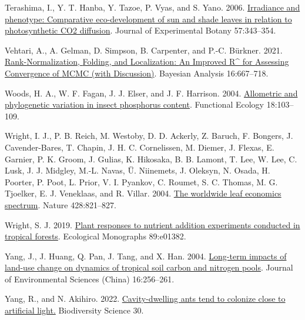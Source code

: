 \documentclass[
  12pt,
  letterpaper,
  DIV=11,
  numbers=noendperiod]{scrartcl}
\newlength{\cslhangindent}
\newlength{\cslentryspacingunit} %
\newenvironment{CSLReferences}[2] %
 {%
  \setlength{\parindent}{0pt}
  \ifodd #1
  \let\oldpar\par
  \def\par{\hangindent=\cslhangindent\oldpar}
  \fi
  \setlength{\parskip}{#2\cslentryspacingunit}
 }%
 {}
\begin{document}
\begin{CSLReferences}{1}{0}
\leavevmode{}%
Terashima, I., Y. T. Hanba, Y. Tazoe, P. Vyas, and S. Yano. 2006.
\href{https://doi.org/10.1093/jxb/erj014}{Irradiance and phenotype:
{Comparative} eco-development of sun and shade leaves in relation to
photosynthetic {CO2} diffusion}. Journal of Experimental Botany
57:343--354.

\leavevmode{}%
Vehtari, A., A. Gelman, D. Simpson, B. Carpenter, and P.-C. Bürkner.
2021. \href{https://doi.org/10.1214/20-BA1221}{Rank-{Normalization},
{Folding}, and {Localization}: {An Improved R\^{}} for {Assessing
Convergence} of {MCMC} (with {Discussion})}. Bayesian Analysis
16:667--718.

\leavevmode{}%
Woods, H. A., W. F. Fagan, J. J. Elser, and J. F. Harrison. 2004.
\href{https://doi.org/10.1111/j.1365-2435.2004.00823.x}{Allometric and
phylogenetic variation in insect phosphorus content}. Functional Ecology
18:103--109.

\leavevmode{}%
Wright, I. J., P. B. Reich, M. Westoby, D. D. Ackerly, Z. Baruch, F.
Bongers, J. Cavender-Bares, T. Chapin, J. H. C. Cornelissen, M. Diemer,
J. Flexas, E. Garnier, P. K. Groom, J. Gulias, K. Hikosaka, B. B.
Lamont, T. Lee, W. Lee, C. Lusk, J. J. Midgley, M.-L. Navas, Ü.
Niinemets, J. Oleksyn, N. Osada, H. Poorter, P. Poot, L. Prior, V. I.
Pyankov, C. Roumet, S. C. Thomas, M. G. Tjoelker, E. J. Veneklaas, and
R. Villar. 2004. \href{https://doi.org/10.1038/nature02403}{The
worldwide leaf economics spectrum}. Nature 428:821--827.

\leavevmode{}%
Wright, S. J. 2019. \href{https://doi.org/10.1002/ecm.1382}{Plant
responses to nutrient addition experiments conducted in tropical
forests}. Ecological Monographs 89:e01382.

\leavevmode{}%
Yang, J., J. Huang, Q. Pan, J. Tang, and X. Han. 2004.
\href{https://www.ncbi.nlm.nih.gov/pubmed/15137650}{Long-term impacts of
land-use change on dynamics of tropical soil carbon and nitrogen pools}.
Journal of Environmental Sciences (China) 16:256--261.

\leavevmode{}%
Yang, R., and N. Akihiro. 2022.
\href{https://doi.org/10.17520/biods.2022067}{{Cavity-dwelling ants tend
to colonize close to artificial light.}} Biodiversity Science 30.


\end{CSLReferences}
\end{document}
